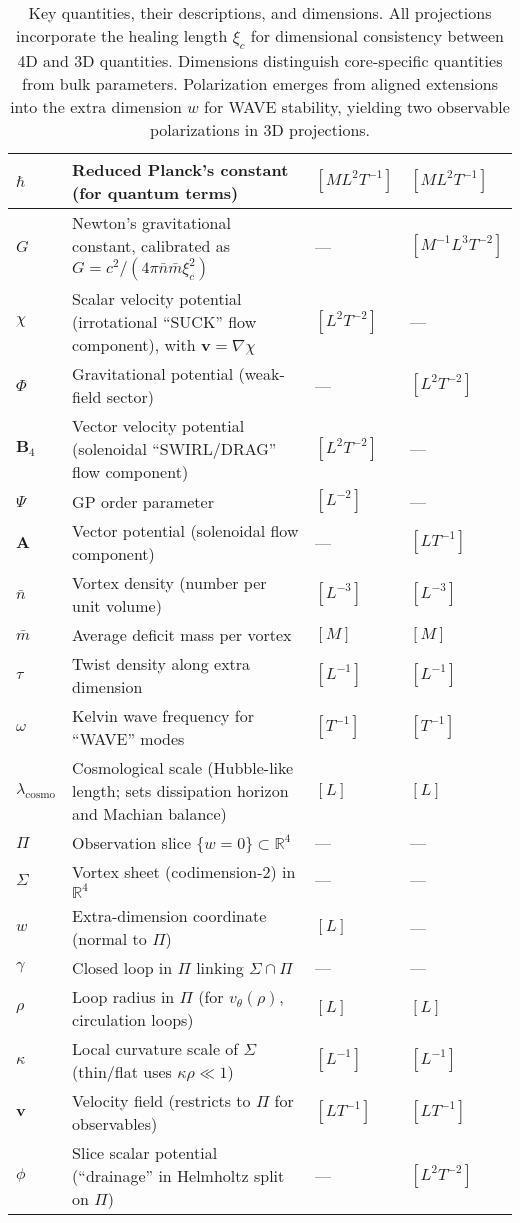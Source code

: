 \begin{table}[H]
\begin{tabularx}{\textwidth}{|l|Y|l|l|}
\hline
$\hbar$ & Reduced Planck's constant (for quantum terms) & $[M L^2 T^{-1}]$ & $[M L^2 T^{-1}]$ \\
\hline
$G$ & Newton's gravitational constant, calibrated as $G = c^2 / (4\pi \bar{n} \bar{m} \xi_c^2)$ & --- & $[M^{-1} L^3 T^{-2}]$ \\
\hline
$\chi$ & Scalar velocity potential (irrotational ``SUCK'' flow component), with $\mathbf v=\nabla\chi$ & $[L^2 T^{-2}]$ & --- \\
\hline
$\Phi$ & Gravitational potential (weak-field sector) & --- & $[L^2 T^{-2}]$ \\
\hline
$\mathbf{B}_4$ & Vector velocity potential (solenoidal ``SWIRL/DRAG'' flow component) & $[L^2 T^{-2}]$ & --- \\
\hline
$\Psi$ & GP order parameter & $[L^{-2}]$ & --- \\
\hline
$\mathbf{A}$ & Vector potential (solenoidal flow component) & --- & $[L T^{-1}]$ \\
\hline
$\bar{n}$ & Vortex density (number per unit volume) & $[L^{-3}]$ & $[L^{-3}]$ \\
\hline
$\bar{m}$ & Average deficit mass per vortex & $[M]$ & $[M]$ \\
\hline
$\tau$ & Twist density along extra dimension & $[L^{-1}]$ & $[L^{-1}]$ \\
\hline
$\omega$ & Kelvin wave frequency for ``WAVE'' modes & $[T^{-1}]$ & $[T^{-1}]$ \\
\hline
$\lambda_{\text{cosmo}}$ & Cosmological scale (Hubble-like length; sets dissipation horizon and Machian balance) & $[L]$ & $[L]$ \\
\hline
$\Pi$ & Observation slice $\{w=0\}\subset\mathbb{R}^4$ & --- & --- \\
\hline
$\Sigma$ & Vortex sheet (codimension-2) in $\mathbb{R}^4$ & --- & --- \\
\hline
$w$ & Extra-dimension coordinate (normal to $\Pi$) & $[L]$ & --- \\
\hline
$\gamma$ & Closed loop in $\Pi$ linking $\Sigma\cap\Pi$ & --- & --- \\
\hline
$\rho$ & Loop radius in $\Pi$ (for $v_\theta(\rho)$, circulation loops) & $[L]$ & $[L]$ \\
\hline
$\kappa$ & Local curvature scale of $\Sigma$ (thin/flat uses $\kappa\rho\ll1$) & $[L^{-1}]$ & $[L^{-1}]$ \\
\hline
$\mathbf{v}$ & Velocity field (restricts to $\Pi$ for observables) & $[L T^{-1}]$ & $[L T^{-1}]$ \\
\hline
$\phi$ & Slice scalar potential (``drainage'' in Helmholtz split on $\Pi$) & --- & $[L^2 T^{-2}]$ \\
\hline
\end{tabularx}
\caption{Key quantities, their descriptions, and dimensions. All projections incorporate the healing length $\xi_c$ for dimensional consistency between 4D and 3D quantities. Dimensions distinguish core-specific quantities from bulk parameters. Polarization emerges from aligned extensions into the extra dimension $w$ for WAVE stability, yielding two observable polarizations in 3D projections.}
\label{tab:notation}
\end{table}
